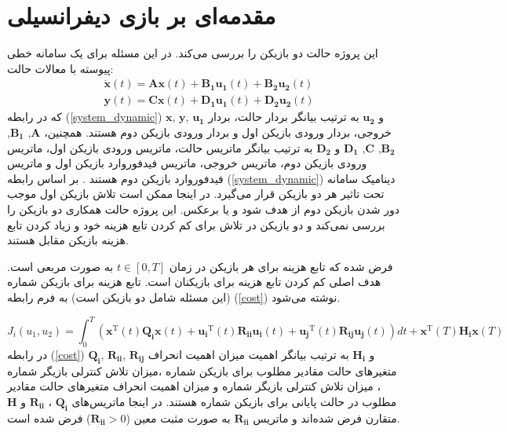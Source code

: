 \section{ مقدمه‌ای بر بازی دیفرانسیلی}\label{diffgameover}

 این پروژه حالت دو بازیکن را بررسی می‌کند. در این مسئله برای یک سامانه خطی پیوسته با معالات حالت:
 \begin{equation}\label{system_dynamic}
 	\begin{split}
 		 	&\boldsymbol{\dot x}(t) = \boldsymbol{Ax}(t) + \boldsymbol{B_1u_1}(t) + \boldsymbol{B_2u_2}(t)%
 		\\
 		&\boldsymbol{y}(t) = \boldsymbol{Cx}(t) + \boldsymbol{D_1u_1}(t) + \boldsymbol{D_2u_2}(t)
 	\end{split}
 \end{equation}
که در رابطه (\ref{system_dynamic})
$\boldsymbol x$, $\boldsymbol y$, $\boldsymbol{u_1}$
و
$\boldsymbol{u_2}$
به ترتیب بیانگر بردار حالت، بردار خروجی، بردار ورودی بازیکن اول و بردار ورودی بازیکن دوم هستند. همچنین، 
$\boldsymbol A$, $\boldsymbol{B_1}$, $\boldsymbol {B_2}$, $\boldsymbol C$, $\boldsymbol {D_1}$
و
$\boldsymbol{D_2}$
به ترتیب بیانگر ماتریس حالت، ماتریس ورودی بازیکن اول، ماتریس ورودی بازیکن دوم، ماتریس خروجی، ماتریس فیدفوروارد بازیکن اول و ماتریس فیدفوروارد بازیکن دوم هستند
\cite{mct}.
بر اساس رابطه (\ref{system_dynamic}) دینامیک سامانه تحت تاثیر هر دو بازیکن قرار می‌گیرد. در اینجا ممکن است تلاش  بازیکن اول موجب دور شدن بازیکن دوم از هدف شود و یا برعکس.  این پروژه حالت همکاری دو بازیکن را بررسی نمی‌کند و دو بازیکن در تلاش برای کم کردن تابع هزینه خود و زیاد کردن تابع هزینه بازیکن مقابل هستند.


  فرض شده  که تابع هزینه برای هر بازیکن در زمان $t \in [0, T]$ به صورت مربعی است.
  هدف اصلی کم کردن تابع هزینه برای بازیکنان است. تابع هزینه برای بازیکن شماره   (این مسئله شامل دو بازیکن است) به فرم رابطه (\ref{cost}) نوشته می‌شود.

 \begin{equation}\label{cost}
 	J_i(u_1, u_2) = \int_{0}^{T}\left( \boldsymbol{x} ^\mathrm{T}(t) \boldsymbol{Q_i} \boldsymbol{x}(t)+
 	 \boldsymbol{u_i} ^\mathrm{T}(t) \boldsymbol{R_{ii}} \boldsymbol{u_i}(t)+
 	 \boldsymbol{u_j} ^\mathrm{T}(t)\boldsymbol{ R_{ij} u_j}(t)
 	\right)dt+
 	\boldsymbol{ x} ^\mathrm{T}(T)\boldsymbol{ H_i}\boldsymbol{ x}(T) 
  \end{equation}
در رابطه
(\ref{cost})
$\boldsymbol{Q_i}$, $\boldsymbol{R_{ii}}$, $\boldsymbol{R_{ij}}$
و
$\boldsymbol{H_i}$
به ترتیب بیانگر اهمیت میزان اهمیت انحراف متغیرهای حالت مقادیر مطلوب برای بازیکن شماره  ،میزان تلاش کنترلی بازیگر شماره  ، میزان تلاش کنترلی بازیگر شماره   و میزان اهمیت انحراف متغیرهای حالت مقادیر مطلوب در حالت پایانی برای بازیکن شماره   هستند.
در اینجا ماتریس‌های 
$\boldsymbol{Q_i}$ ، $\boldsymbol{R_{ii}}$
و
$\boldsymbol{H}$
متقارن فرض شده‌اند و ماتریس 
$\boldsymbol{R_{ii}}$
به صورت مثبت معین ($\boldsymbol{R_{ii}}>0$)
فرض شده است\cite{article1}.

